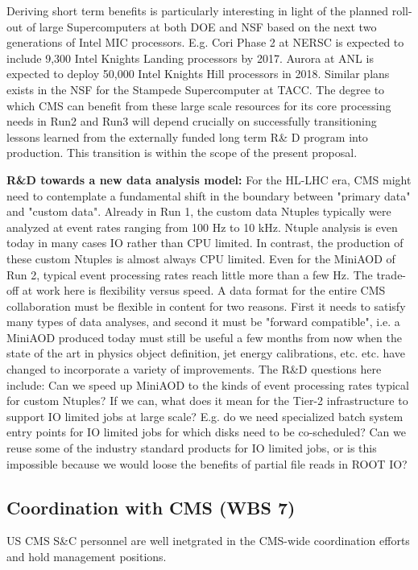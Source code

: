 \documentclass[11pt,a4paper]{article}
\begin{document}
Deriving short term benefits is particularly interesting in light of the planned roll-out of large Supercomputers at both DOE and NSF
based on the next two generations of Intel MIC processors. E.g. Cori Phase 2 at NERSC is expected to 
include 9,300 Intel Knights Landing processors by 2017. Aurora at ANL is expected to deploy 50,000 Intel Knights Hill processors in 2018.
Similar plans exists in the NSF for the Stampede Supercomputer at TACC.
The degree to which CMS can benefit from these large scale resources
for its core processing needs in Run2 and Run3 
will depend crucially on successfully transitioning lessons learned from the externally funded 
long term R\& D program into production. This transition is within the scope of the present proposal.

{\bf R\&D towards a new data analysis model:}
For the HL-LHC era, CMS might need to contemplate a fundamental shift in the boundary between "primary data" and "custom data".
Already in Run 1, the custom data Ntuples typically were analyzed at event rates ranging from 100 Hz to 10 kHz. 
Ntuple analysis is even today
in many cases IO rather than CPU limited. In contrast, the production of these custom Ntuples is almost always CPU limited. Even for the MiniAOD of Run 2, typical event processing rates reach little more than a few Hz.
The trade-off at work here is flexibility versus speed. A data format for the entire CMS collaboration must be flexible in content for two reasons. First it needs to satisfy many types of data analyses, and second it must be "forward compatible", i.e. a MiniAOD produced today
must still be useful a few months from now when the state of the art in physics object definition, jet energy calibrations, etc. etc. have
changed to incorporate a variety of improvements. The R\&D questions here include: Can we speed up MiniAOD to the kinds of 
event processing rates typical for custom Ntuples? If we can, what does it mean for the Tier-2 infrastructure to support IO limited
jobs at large scale? E.g. do we need specialized batch system entry points for IO limited jobs for which disks need to be co-scheduled?
Can we reuse some of the industry standard products for IO limited jobs, or is this impossible because we would loose the benefits of partial file reads in ROOT IO?


\subsection{Coordination with CMS (WBS 7)}

US CMS S\&C personnel are well inetgrated in the CMS-wide coordination
efforts and hold management positions.  
\end{document}

